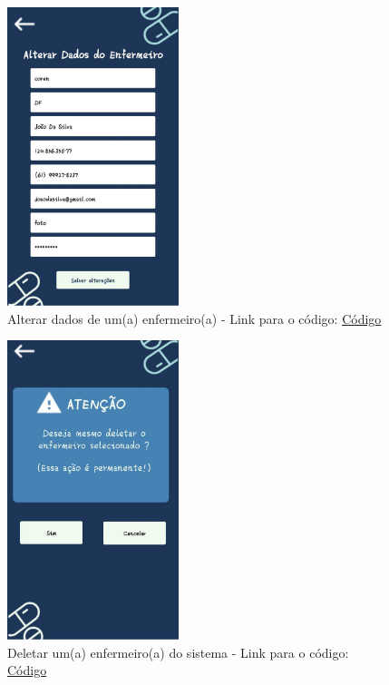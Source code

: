 \begin{apendicesenv}
\begin{figure}[H]
    \centering
    \includegraphics[width=5cm]{figuras/software/telas_frontend/front_AlterarDadosEnfermeiro.jpg}
    \caption{Alterar dados de um(a) enfermeiro(a) - Link para o código: \href{https://github.com/PillWatcher/pillwatcher-dpf-service/blob/dev/components/alterarDadosEnfermeiro.js}{Código}}
    \label{fig:alterar_dados_enfermeiro}
\end{figure}

\begin{figure}[H]
    \centering
    \includegraphics[width=5cm]{figuras/software/telas_frontend/front_DeletarEnfermeiro.jpg}
    \caption{Deletar um(a) enfermeiro(a) do sistema - Link para o código: \href{https://github.com/PillWatcher/pillwatcher-dpf-service/blob/dev/components/deletarEnfermeiro.js}{Código}}
    \label{fig:deletar_enfermeiro}
\end{figure}


\end{apendicesenv}
